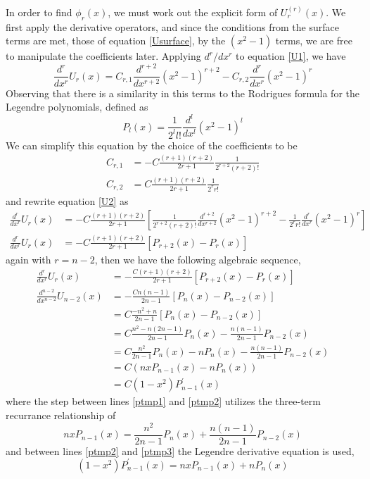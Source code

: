 \documentclass[preprint]{revtex4}
\begin{document}
In order to find $\phi_r(x)$, we must work out the explicit form of $U_r^{(r)}(x)$. 
We first apply the derivative operators, and since the conditions from the surface terms
are met, those of equation \ref{Usurface}, by the $(x^2-1)$ terms, we are free to 
manipulate the coefficients later. Applying $d^r/dx^r$ to equation \ref{U1}, we have
\begin{equation}
\label{U2}
\frac{d^r}{dx^r}U_r(x)=C_{r,1}\frac{d^{r+2}}{dx^{r+2}}(x^2-1)^{r+2}-C_{r,2}\frac{d^r}{dx^r}(x^2-1)^r
\end{equation}
Observing that there is a similarity in this terms to the Rodrigues formula for the 
Legendre polynomials, defined as
\begin{equation}
\label{RodriguesLegendre}
P_l(x)=\frac{1}{2^ll!}\frac{d^l}{dx^l}(x^2-1)^l
\end{equation}
We can simplify this equation by the choice of the coefficients to be
\begin{align}
\label{Crcoef1}
C_{r,1}&=-C\frac{(r+1)(r+2)}{2r+1}\frac{1}{2^{r+2}(r+2)!} \\
\label{Crcoef2}
C_{r,2}&=C\frac{(r+1)(r+2)}{2r+1}\frac{1}{2^{r}r!} 
\end{align}
and rewrite equation \ref{U2} as
\begin{align}
\frac{d^r}{dx^r}U_r(x) &= -C\frac{(r+1)(r+2)}{2r+1}\left[ \frac{1}{2^{r+2}(r+2)!}\frac{d^{r+2}}{dx^{r+2}}(x^2-1)^{r+2}-\frac{1}{2^rr!}\frac{d^r}{dx^r}(x^2-1)^r\right] \\
\frac{d^r}{dx^r}U_r(x)&=-C \frac{(r+1)(r+2)}{2r+1}\left[ P_{r+2}(x)-P_r(x) \right] 
\end{align}
again with $r=n-2$, then we have the following algebraic sequence, 
\begin{align}
\frac{d^r}{dx^r}U_r(x) &= -\frac{C(r+1)(r+2)}{2r+1}\left[ P_{r+2}(x)-P_r(x) \right]  \\
\frac{d^{n-2}}{dx^{n-2}}U_{n-2}(x) &= -\frac{Cn(n-1)}{2n-1}\left[ P_{n}(x)-P_{n-2}(x) \right]  \\
 &= C\frac{-n^2+n}{2n-1}\left[ P_{n}(x)-P_{n-2}(x) \right]  \\
 &= C\frac{n^2-n(2n-1)}{2n-1}P_{n}(x)-\frac{n(n-1)}{2n-1}P_{n-2}(x)   \\
\label{ptmp1}
 &= C\frac{n^2}{2n-1}P_n(x)-nP_{n}(x)-\frac{n(n-1)}{2n-1}P_{n-2}(x)   \\
\label{ptmp2}
 &= C\left(nxP_{n-1}(x)-nP_{n}(x)\right)\\
\label{ptmp3}
 &=C(1-x^2)P_{n-1}^\prime(x)
\end{align}
where the step between lines \ref{ptmp1} and \ref{ptmp2} utilizes the three-term
recurrance relationship of 
\begin{equation}
nxP_{n-1}(x)=\frac{n^2}{2n-1}P_n(x)+\frac{n(n-1)}{2n-1}P_{n-2}(x)
\end{equation}
and between lines \ref{ptmp2} and \ref{ptmp3} the Legendre derivative 
equation is used, 
\begin{equation}
(1-x^2)P_{n-1}^\prime(x)=nxP_{n-1}(x)+nP_{n}(x)
\end{equation}
\end{document}
